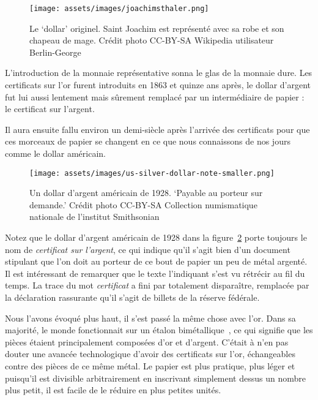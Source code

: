 \begin{figure}
  \centering
  \texttt{[image: assets/images/joachimsthaler.png]}
  \caption{Le `dollar' originel. Saint Joachim est représenté avec sa robe et
  son chapeau de mage. Crédit photo CC-BY-SA Wikipedia utilisateur
  Berlin-George}
  \label{fig:joachimsthaler}
\end{figure}

L'introduction de la monnaie représentative sonna le glas de la monnaie dure.
Les certificats sur l'or furent introduits en 1863 et quinze ans après, le
dollar d'argent fut lui aussi lentement mais sûrement remplacé par un
intermédiaire de papier : le certificat sur l'argent.
\cite{wiki:silver-certificate}

Il aura ensuite fallu environ un demi-siècle après l'arrivée des certificats
pour que ces morceaux de papier se changent en ce que nous connaissons de nos
jours comme le dollar américain.

\begin{figure}
  \centering
  \texttt{[image: assets/images/us-silver-dollar-note-smaller.png]}
  \caption{Un dollar d'argent américain de 1928. `Payable au porteur sur
  demande.' Crédit photo CC-BY-SA Collection numismatique nationale de
  l'institut Smithsonian}
  \label{fig:us-silver-dollar-note-smaller}
\end{figure}

Notez que le dollar d'argent américain de 1928 dans la
figure~\ref{fig:us-silver-dollar-note-smaller} porte toujours le nom de
\textit{certificat sur l'argent}, ce qui indique qu'il s'agit bien d'un document
stipulant que l'on doit au porteur de ce bout de papier un peu de métal argenté.
Il est intéressant de remarquer que le texte l'indiquant s'est vu rétrécir au
fil du temps. La trace du mot \textit{certificat} a fini par totalement
disparaître, remplacée par la déclaration rassurante qu'il s'agit de billets de
la réserve fédérale.

Nous l'avons évoqué plus haut, il s'est passé la même chose avec l'or. Dans sa
majorité, le monde fonctionnait sur un étalon
bimétallique~\cite{wiki:bimetallism}, ce qui signifie que les pièces étaient
principalement composées d'or et d'argent. C'était à n'en pas douter une avancée
technologique d'avoir des certificats sur l'or, échangeables contre des pièces
de ce même métal. Le papier est plus pratique, plus léger et puisqu'il est
divisible arbitrairement en inscrivant simplement dessus un nombre plus petit,
il est facile de le réduire en plus petites unités.


